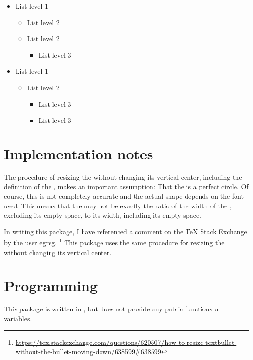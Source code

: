 \documentclass{beery}
\begin{document}
\begingroup
  \newfontfamilysourceseriffour
  \begin{multicols}{2}
    \begin{itemize}
      \item List level 1
      \begin{itemize}
        \item List level 2
        \item List level 2
        \begin{itemize}
          \item List level 3
        \end{itemize}
      \end{itemize}
      \item List level 1
      \begin{itemize}
        \item List level 2
        \begin{itemize}
          \item List level 3
          \item List level 3
        \end{itemize}
      \end{itemize}
    \end{itemize}
  \end{multicols}
\endgroup


\section{Implementation notes}
\label{sec:implementation}

The procedure of resizing the  without changing its vertical center, including the definition of the \textbulletfactor{}, makes an important assumption:
That the  is a perfect circle.
Of course, this is not completely accurate and the actual shape depends on the font used.
This means that the \textbulletfactor{} may not be exactly the ratio of the width of the , excluding its empty space, to its width, including its empty space.

In writing this package, I have referenced a comment on the \TeX{} Stack Exchange by the user egreg.%
\footnote{\url{https://tex.stackexchange.com/questions/620507/how-to-resize-textbullet-without-the-bullet-moving-down/638599\#638599}}
This package uses the same procedure for resizing the  without changing its vertical center.


\section{Programming}
\label{sec:programming}

This package is written in , but does not provide any public functions or variables.
\end{document}
